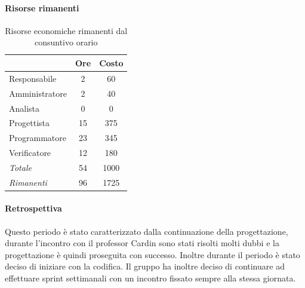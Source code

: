 \documentclass[a4paper,12pt]{article}
\begin{document}
            \paragraph{Risorse rimanenti}
                \begin{table}[H]
                \centering
                \caption{Risorse economiche rimanenti dal consuntivo orario}
                \begin{tabular}{|l|c|c|}
                \hline
                    \rowcolor{lightgray}{\textbf{Ruolo}} & {\textbf{Ore}} & {\textbf{Costo}}\\
                \hline
                    Responsabile & 2 & 60\\
                \hline
                    Amministratore & 2 & 40\\
                \hline
                    Analista & 0 & 0\\
                \hline
                    Progettista & 15 & 375\\
                \hline
                    Programmatore & 23 & 345\\
                \hline
                    Verificatore & 12 & 180\\
                \hline
                    \rowcolor{lightgray}\textit{Totale} & 54 & 1000\\
                \hline
                    \rowcolor{lightgray}\textit{Rimanenti} & 96 & 1725\\
                \hline
                \end{tabular}
                \end{table}
                
            \paragraph{Retrospettiva}
            Questo periodo è stato caratterizzato dalla continuazione della progettazione, durante l'incontro con il professor Cardin sono stati risolti molti dubbi e la progettazione è quindi proseguita con successo.
            Inoltre durante il periodo è stato deciso di iniziare con la codifica. Il gruppo ha inoltre deciso di continuare ad effettuare sprint settimanali con un incontro fissato sempre alla stessa giornata.
\end{document}
